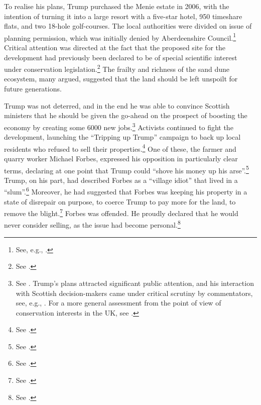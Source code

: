 To realise his plans, Trump purchased the Menie estate in 2006, with the intention of turning it into a large resort with a five-star hotel, 950 timeshare flats, and two 18-hole golf-courses. The local authorities were divided on issue of planning permission, which was initially denied by Aberdeenshire Council.\footnote{See, e.g., \cite{bbc07}.} Critical attention was directed at the fact that the proposed site for the development had previously been declared to be of special scientific interest under conservation legislation.\footnote{See \cite{bbc07b}.} The frailty and richness of the sand dune ecosystem, many argued, suggested that the land should be left unspoilt for future generations. 

Trump was not deterred, and in the end he was able to convince Scottish ministers that he should be given the go-ahead on the prospect of boosting the economy by creating some 6000 new jobs.\footnote{See \cite{carrell08}. Trump's plans attracted significant public attention, and his interaction with Scottish decision-makers came under critical scrutiny by commentators, see, e.g., \cite{jenkins08}. For a more general assessment from the point of view of conservation interests in the UK, see \cite{koen13}.} Activists continued to fight the development, launching the ``Tripping up Trump'' campaign to back up local residents who refused to sell their properties.\footnote{See \cite{tripping15}.} One of these, the farmer and quarry worker Michael Forbes, expressed his opposition in particularly clear terms, declaring at one point that Trump could ``shove his money up his arse''.\footnote{See \cite{scotsman10}.} Trump, on his part, had described Forbes as a ``village idiot'' that lived in a ``slum''.\footnote{See \cite{bbc10}.} Moreover, he had suggested that Forbes was keeping his property in a state of disrepair on purpose, to coerce Trump to pay more for the land, to remove the blight.\footnote{See \cite{cnn07}.} Forbes was offended. He proudly declared that he would never consider selling, as the issue had become personal.\footnote{See \cite{ferguson12}.}

